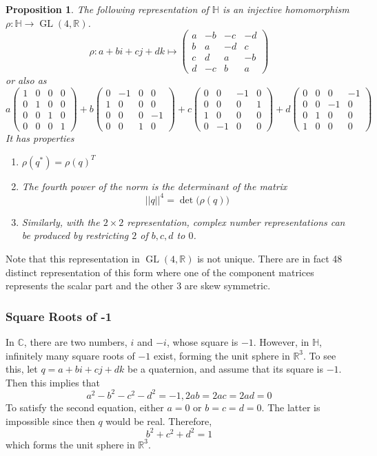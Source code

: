 \documentclass{article}
\DeclareMathOperator{\GL}{GL}
\newtheorem{proposition}[theorem]{Proposition}
\theoremstyle{remark}
\theoremstyle{definition}
\begin{document}
\begin{proposition}
The following representation of $\mathbb{H}$ is an injective homomorphism $\rho: \mathbb{H} \longrightarrow \GL(4, \mathbb{R})$. 
\[\rho: a+bi+cj+dk \mapsto \begin{pmatrix}
a&-b&-c&-d \\
b&a&-d&c\\
c&d&a&-b\\
d&-c&b&a
\end{pmatrix}\]
or also as
\[a \begin{pmatrix}
1 &0 &0 &0 \\
0& 1&0&0\\
0&0&1&0\\
0&0&0&1
\end{pmatrix} + b \begin{pmatrix}
0&-1&0&0\\1&0&0&0\\0&0&0&-1\\0&0&1&0
\end{pmatrix} + c\begin{pmatrix}
0&0&-1&0\\0&0&0&1\\1&0&0&0\\0&-1&0&0
\end{pmatrix} + d \begin{pmatrix}
0&0&0&-1\\0&0&-1&0\\0&1&0&0\\1&0&0&0
\end{pmatrix}\]
It has properties
\begin{enumerate}
    \item $\rho(q^*) = \rho(q)^T$
    \item The fourth power of the norm is the determinant of the matrix 
    \[||q||^4 = \det\big( \rho (q)\big)\]
    \item Similarly, with the $2\times 2$ representation, complex number representations can be produced by restricting $2$ of $b, c, d$ to $0$. 
\end{enumerate}
\end{proposition}

Note that this representation in $\GL(4, \mathbb{R})$ is not unique. There are in fact 48 distinct representation of this form where one of the component matrices represents the scalar part and the other 3 are skew symmetric. 

\subsubsection{Square Roots of -1}
In $\mathbb{C}$, there are two numbers, $i$ and $-i$, whose square is $-1$. However, in $\mathbb{H}$, infinitely many square roots of $-1$ exist, forming the unit sphere in $\mathbb{R}^3$. To see this, let $q = a+bi+cj+dk$ be a quaternion, and assume that its square is $-1$. Then this implies that
\[a^2 - b^2 -c^2 -d^2 = -1, 2ab = 2ac = 2ad = 0\]
To satisfy the second equation, either $a=0$ or $b=c=d=0$. The latter is impossible since then $q$ would be real. Therefore, 
\[b^2 + c^2 + d^2 = 1\]
which forms the unit sphere in $\mathbb{R}^3$. 
\end{document}
